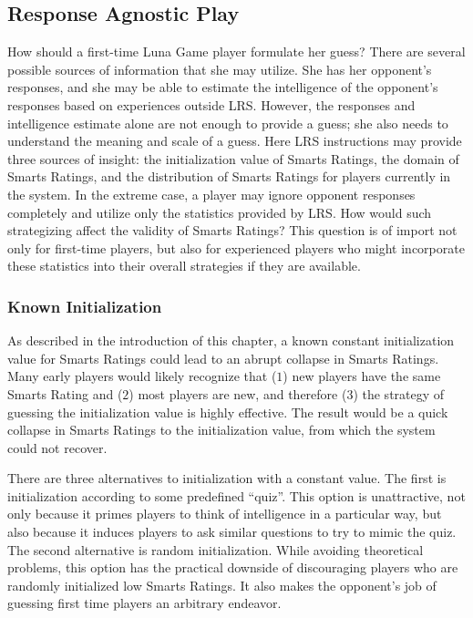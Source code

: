 \subsection{Response Agnostic Play}

How should a first-time Luna Game player formulate her guess? There are several possible sources of information that she may utilize. She has her opponent's responses, and she may be able to estimate the intelligence of the opponent's responses based on experiences outside LRS. However, the responses and intelligence estimate alone are not enough to provide a guess; she also needs to understand the meaning and scale of a guess. Here LRS instructions may provide three sources of insight: the initialization value of Smarts Ratings, the domain of Smarts Ratings, and the distribution of Smarts Ratings for players currently in the system. In the extreme case, a player may ignore opponent responses completely and utilize only the statistics provided by LRS. How would such strategizing affect the validity of Smarts Ratings? This question is of import not only for first-time players, but also for experienced players who might incorporate these statistics into their overall strategies if they are available.

\subsubsection{Known Initialization}

As described in the introduction of this chapter, a known constant initialization value for Smarts Ratings could lead to an abrupt collapse in Smarts Ratings. Many early players would likely recognize that ($1$) new players have the same Smarts Rating and ($2$) most players are new, and therefore ($3$) the strategy of guessing the initialization value is highly effective. The result would be a quick collapse in Smarts Ratings to the initialization value, from which the system could not recover. 

There are three alternatives to initialization with a constant value. The first is initialization according to some predefined ``quiz''. This option is unattractive, not only because it primes players to think of intelligence in a particular way, but also because it induces players to ask similar questions to try to mimic the quiz. The second alternative is random initialization. While avoiding theoretical problems, this option has the practical downside of discouraging players who are randomly initialized low Smarts Ratings. It also makes the opponent's job of guessing first time players an arbitrary endeavor.

